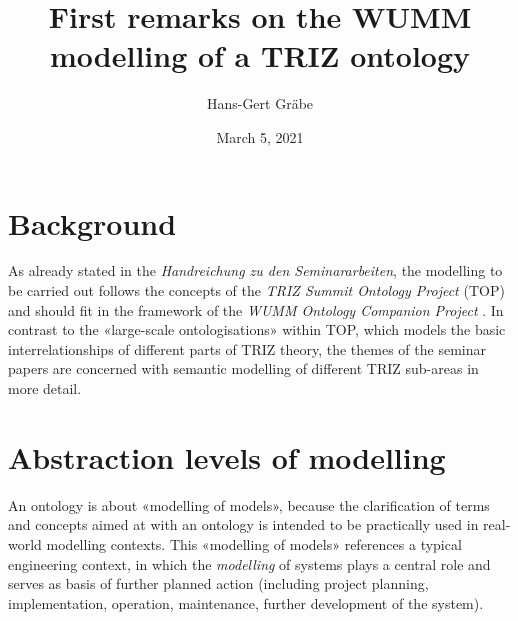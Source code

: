 \documentclass[11pt,a4paper]{article}
\title{First remarks on the WUMM modelling of a TRIZ ontology}
\author{Hans-Gert Gr\"abe}
\date{March 5,  2021}
\begin{document}
\maketitle

\section{Background}

As already stated in the \emph{Handreichung zu den Seminararbeiten}, the
modelling to be carried out follows the concepts of the \emph{TRIZ Summit
  Ontology Project} (TOP) \cite{TOP} and should fit in the framework of the
\emph{WUMM Ontology Companion Project} \cite{WUMM-Ontology}.  In contrast to
the «large-scale ontologisations» within TOP, which models the basic
interrelationships of different parts of TRIZ theory, the themes of the
seminar papers are concerned with semantic modelling of different TRIZ
sub-areas in more detail.

\section{Abstraction levels of modelling}

An ontology is about «modelling of models», because the clarification of terms
and concepts aimed at with an ontology is intended to be practically used in
real-world modelling contexts.  This «modelling of models» references a
typical engineering context, in which the \emph{modelling} of systems plays a
central role and serves as basis of further planned action (including project
planning, implementation, operation, maintenance, further development of the
system).
\end{document}
